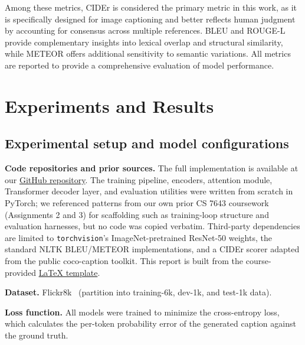 \documentclass[10pt,twocolumn,letterpaper]{article}
\begin{document}
Among these metrics, CIDEr is considered the primary metric in this
work, as it is specifically designed for image captioning and better
reflects human judgment by accounting for consensus across multiple
references. BLEU and ROUGE-L provide complementary insights into
lexical overlap and structural similarity, while METEOR offers
additional sensitivity to semantic variations. All metrics are
reported to provide a comprehensive evaluation of model performance.

\section{Experiments and Results}

\subsection{Experimental setup and model configurations}

\noindent\textbf{Code repositories and prior sources.}
The full implementation is available at our
\href{https://github.com/haoyang86/ImageCaptioning/tree/main}{GitHub
repository}. The training pipeline, encoders, attention module,
Transformer decoder layer, and evaluation utilities were written from
scratch in PyTorch; we referenced patterns from our own prior CS 7643
coursework (Assignments 2 and 3) for scaffolding such as training-loop
structure and evaluation harnesses, but no code was copied verbatim.
Third-party dependencies are limited to \texttt{torchvision}'s
ImageNet-pretrained ResNet-50 weights, the standard NLTK BLEU/METEOR
implementations, and a CIDEr scorer adapted from the public
coco-caption toolkit. This report is built from the course-provided
\href{https://www.overleaf.com/project/5f5ec061aa94370001943266}{\LaTeX{}
template}.


\noindent\textbf{Dataset.}
Flickr8k~\cite{hodosh2013framing} (partition into training-6k,
dev-1k, and test-1k data).

\noindent\textbf{Loss function.} All models were trained to minimize the
cross-entropy loss, which calculates the per-token probability error
of the generated caption against the ground truth.
\end{document}
